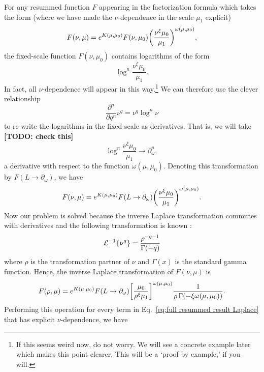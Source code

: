 \documentclass[12pt,twoside,class=../reedthesis, crop=false]{standalone}
\providecommand{\cL}{\mathcal{L}}
\begin{document}
	For any resummed function $F$ appearing in the factorization formula which takes the form (where we have made the $\nu$-dependence in the scale $\mu_1$ explicit)
	\begin{equation}
		F(\nu, \mu) = e^{K(\mu, \mu_0)} F(\nu, \mu_0) \qty(\frac{\nu^\xi \mu_0}{\mu_1})^{\omega(\mu, \mu_0)},
	\end{equation}
	the fixed-scale function $F(\nu, \mu_0)$ contains logarithms of the form \cite{frye_factorization_2016}
	\begin{equation}
		\log^n \frac{\nu^\xi \mu_0}{\mu_1}.
	\end{equation}
	In fact, all $\nu$-dependence will appear in this way.\footnote{If this seems weird now, do not worry. We will see a concrete example later which makes this point clearer. This will be a `proof by example,' if you will.} We can therefore use the clever relationship \cite{becher_factorization_2007,frye_factorization_2016}
	\begin{equation}
		\frac{\partial^n}{\partial q^n} \nu^q = \nu^q \log^n \nu
	\end{equation}
	to re-write the logarithms in the fixed-scale as derivatives. That is, we will take {\color{red}\textbf{[TODO: check this]}}
	\begin{equation}
		\log^n \frac{\nu^\xi \mu_0}{\mu_1} \to \partial^n_{\omega},
	\end{equation}
	a derivative with respect to the function $\omega(\mu, \mu_0)$. Denoting this transformation by $F(L \to \partial_\omega)$, we have
	\begin{equation}
		F(\nu, \mu) = e^{K(\mu, \mu_0)} F(L \to \partial_\omega) \qty(\frac{\nu^\xi \mu_0}{\mu_1})^{\omega(\mu, \mu_0)}.
	\end{equation}
	Now our problem is solved because the inverse Laplace transformation commutes with derivatives and the following transformation is known \cite{frye_factorization_2016}:
	\begin{equation}
		\cL^{-1}\qty{\nu^q} = \frac{\rho^{-q - 1}}{\Gamma(-q)}
	\end{equation}
	where $\rho$ is the transformation partner of $\nu$ and $\Gamma(x)$ is the standard gamma function. Hence, the inverse Laplace transformation of $F(\nu, \mu)$ is
	\begin{equation}
		F(\rho, \mu) = e^{K(\mu, \mu_0)} F(L \to \partial_\omega)\qty[\frac{\mu_0}{\rho^\xi\mu_1}]^{\omega(\mu, \mu_0)} \frac{1}{\rho\,\Gamma(-\xi \omega(\mu, \mu_0))}.
	\end{equation}
	Performing this operation for every term in Eq.~\ref{eq:full resummed result Laplace} that has explicit $\nu$-dependence, we have
\end{document}

